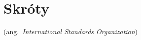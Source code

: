 \chapter*{Skróty}
\label{sec:skroty}
\noindent\vspace{-\topsep-\partopsep-\parsep} %
\begin{description}[labelwidth=*]
  \item [ISO] (ang.\ \emph{International Standards Organization})
\end{description}

